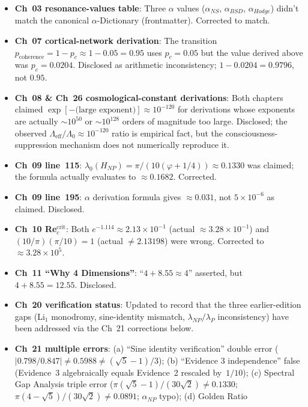 \begin{itemize}
\item \textbf{Ch~03 resonance-values table}: Three $\alpha$ values
  ($\alpha_{NS}$, $\alpha_{BSD}$, $\alpha_{Hodge}$) didn't match the
  canonical $\alpha$-Dictionary (frontmatter). Corrected to match.
\item \textbf{Ch~07 cortical-network derivation}: The transition
  $p_{\text{coherence}} = 1 - p_c \approx 1 - 0.05 = 0.95$ uses
  $p_c = 0.05$ but the value derived above was $p_c = 0.0204$. Disclosed
  as arithmetic inconsistency; $1 - 0.0204 = 0.9796$, not $0.95$.
\item \textbf{Ch~08 \& Ch~26 cosmological-constant derivations}: Both
  chapters claimed $\exp[-\text{(large exponent)}] \approx 10^{-120}$
  for derivations whose exponents are actually $\sim 10^{50}$ or
  $\sim 10^{128}$ orders of magnitude too large. Disclosed; the observed
  $\Lambda_{\text{eff}}/\Lambda_0 \approx 10^{-120}$ ratio is empirical
  fact, but the consciousness-suppression mechanism does not numerically
  reproduce it.
\item \textbf{Ch~09 line~115}: $\lambda_0(H_{NP}) = \pi/(10(\varphi+1/4))
  \approx 0.1330$ was claimed; the formula actually evaluates to
  $\approx 0.1682$. Corrected.
\item \textbf{Ch~09 line~195}: $\alpha$ derivation formula gives
  $\approx 0.031$, not $5 \times 10^{-6}$ as claimed. Disclosed.
\item \textbf{Ch~10 Re$_c^{\text{crit}}$}: Both $e^{-1.114} \approx 2.13
  \times 10^{-1}$ (actual $\approx 3.28 \times 10^{-1}$) and
  $(10/\pi)(\pi/10) = 1$ (actual $\neq 2.13198$) were wrong.
  Corrected to $\approx 3.28 \times 10^5$.
\item \textbf{Ch~11 ``Why 4 Dimensions''}: ``$4 + 8.55 \approx 4$''
  asserted, but $4 + 8.55 = 12.55$. Disclosed.
\item \textbf{Ch~20 verification status}: Updated to record that the
  three earlier-edition gaps (Li$_1$ monodromy, sine-identity mismatch,
  $\lambda_{NP}/\lambda_P$ inconsistency) have been addressed via the
  Ch~21 corrections below.
\item \textbf{Ch~21 multiple errors}: (a) ``Sine identity verification''
  double error ($|0.798/0.847| \neq 0.5988 \neq (\sqrt{5}-1)/3$); (b)
  ``Evidence 3 independence'' false (Evidence~3 algebraically equals
  Evidence~2 rescaled by~$1/10$); (c) Spectral Gap Analysis triple
  error ($\pi(\sqrt{5}-1)/(30\sqrt{2}) \neq 0.1330$; $\pi(4-\sqrt{5})/
  (30\sqrt{2}) \neq 0.0891$; $\alpha_{NP}$ typo); (d) Golden Ratio

\end{itemize}
